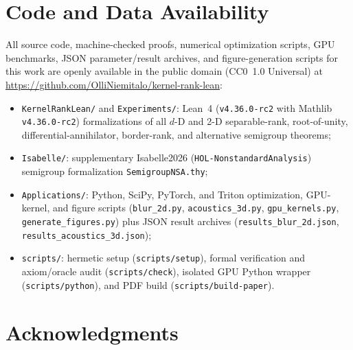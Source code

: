\documentclass[11pt,a4paper]{article}
\theoremstyle{plain}
\theoremstyle{definition}
\DeclareRobustCommand{\leanid}[1]{{\def\_{\textunderscore\allowbreak}\texttt{#1}}}
\begin{document}
\section*{Code and Data Availability}

All source code, machine-checked proofs, numerical optimization scripts, GPU benchmarks, JSON parameter/result archives, and figure-generation scripts for this work are openly available in the public domain (CC0~1.0 Universal) at \url{https://github.com/OlliNiemitalo/kernel-rank-lean}:
\begin{itemize}[leftmargin=1.8em,itemsep=1pt]
  \item \texttt{KernelRankLean/} and \texttt{Experiments/}: Lean~4 (\texttt{v4.36.0-rc2} with Mathlib \texttt{v4.36.0-rc2}) formalizations of all $d$-D and 2-D separable-rank, root-of-unity, differential-annihilator, border-rank, and alternative semigroup theorems;
  \item \texttt{Isabelle/}: supplementary Isabelle2026 (\leanid{HOL-Nonstandard\_Analysis}) semigroup formalization \leanid{Semigroup\_NSA.thy};
  \item \texttt{Applications/}: Python, SciPy, PyTorch, and Triton optimization, GPU-kernel, and figure scripts (\texttt{blur\_2d.py}, \texttt{acous\-tics\_3d.py}, \texttt{gpu\_\allowbreak kernels.py}, \texttt{generate\_\allowbreak figures.py}) plus JSON result archives (\texttt{results\_\allowbreak blur\_2d.json}, \texttt{results\_\allowbreak acous\-tics\_3d.json});
  \item \texttt{scripts/}: hermetic setup (\texttt{scripts/setup}), formal verification and axiom/oracle audit (\texttt{scripts/check}), isolated GPU Python wrapper (\texttt{scripts/python}), and PDF build (\texttt{scripts/build-paper}).
\end{itemize}

\section*{Acknowledgments}
\end{document}
